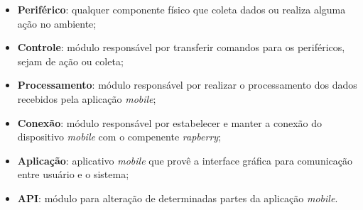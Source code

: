 \begin{itemize}
  \item \textbf{Periférico}: qualquer componente físico que coleta dados ou realiza alguma ação no ambiente;
  \item \textbf{Controle}: módulo responsável por transferir comandos para os periféricos, sejam de ação ou coleta;
  \item \textbf{Processamento}: módulo responsável por realizar o processamento dos dados recebidos pela aplicação \textit{mobile};
  \item \textbf{Conexão}: módulo responsável por estabelecer e manter a conexão do dispositivo \textit{mobile} com o compenente \textit{rapberry};
  \item \textbf{Aplicação}: aplicativo \textit{mobile} que provê a interface gráfica para comunicação entre usuário e o sistema;
  \item \textbf{API}: módulo para alteração de determinadas partes da aplicação \textit{mobile}.
\end{itemize}
